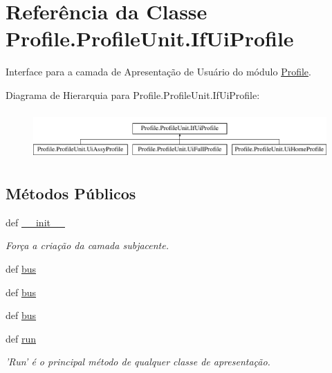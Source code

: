 \hypertarget{classProfile_1_1ProfileUnit_1_1IfUiProfile}{\section{Referência da Classe Profile.\-Profile\-Unit.\-If\-Ui\-Profile}
\label{classProfile_1_1ProfileUnit_1_1IfUiProfile}
}


Interface para a camada de Apresentação de Usuário do módulo \hyperlink{namespaceProfile}{Profile}.  


Diagrama de Hierarquia para Profile.\-Profile\-Unit.\-If\-Ui\-Profile\-:\begin{figure}[H]
\begin{center}
\leavevmode
\includegraphics[height=1.839080cm]{dc/d25/classProfile_1_1ProfileUnit_1_1IfUiProfile}
\end{center}
\end{figure}
\subsection*{Métodos Públicos}
\begin{DoxyCompactItemize}
\item 
def \hyperlink{classProfile_1_1ProfileUnit_1_1IfUiProfile_a558fbb501ee3dbc4a16d3165479c38bc}{\-\_\-\-\_\-init\-\_\-\-\_\-}
\begin{DoxyCompactList}\small\item\em Força a criação da camada subjacente. \end{DoxyCompactList}\item 
def \hyperlink{classProfile_1_1ProfileUnit_1_1IfUiProfile_ac3d0a7a780dcf729b9f3cf1fff243a78}{bus}
\item 
def \hyperlink{classProfile_1_1ProfileUnit_1_1IfUiProfile_ac3d0a7a780dcf729b9f3cf1fff243a78}{bus}
\item 
def \hyperlink{classProfile_1_1ProfileUnit_1_1IfUiProfile_ac3d0a7a780dcf729b9f3cf1fff243a78}{bus}
\item 
def \hyperlink{classProfile_1_1ProfileUnit_1_1IfUiProfile_afb22574cb4a2dc58c068437bd7075e5a}{run}
\begin{DoxyCompactList}\small\item\em 'Run' é o principal método de qualquer classe de apresentação. \end{DoxyCompactList}\end{DoxyCompactItemize}

